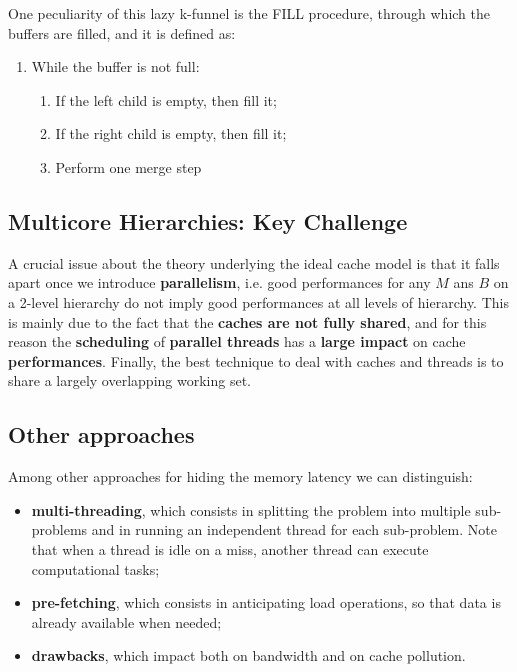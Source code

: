 One peculiarity of this lazy k-funnel is the FILL procedure, through which the buffers are filled, and it is defined as:

\begin{enumerate}
    \item While the buffer is not full:
    \begin{enumerate}
        \item If the left child is empty, then fill it;
        \item If the right child is empty, then fill it;
        \item Perform one merge step
    \end{enumerate}
\end{enumerate}

\subsection{Multicore Hierarchies: Key Challenge}
A crucial issue about the theory underlying the ideal cache model is that it falls apart once we introduce \textbf{parallelism}, i.e. good performances for any $M$ ans $B$ on a 2-level hierarchy do not imply good performances at all levels of hierarchy. This is mainly due to the fact that the \textbf{caches are not fully shared}, and for this reason the \textbf{scheduling} of \textbf{parallel threads} has a \textbf{large impact} on cache \textbf{performances}. Finally, the best technique to deal with caches and threads is to share a largely overlapping working set. 

\subsection{Other approaches}
Among other approaches for hiding the memory latency we can distinguish:

\begin{itemize}

    \item \textbf{multi-threading}, which consists in splitting the problem into multiple sub-problems and in running an independent thread for each sub-problem. Note that when a thread is idle on a miss, another thread can execute computational tasks;

    \item \textbf{pre-fetching}, which consists in anticipating load operations, so that data is already available when needed;

    \item \textbf{drawbacks}, which impact both on bandwidth and on cache pollution.
    
\end{itemize}

